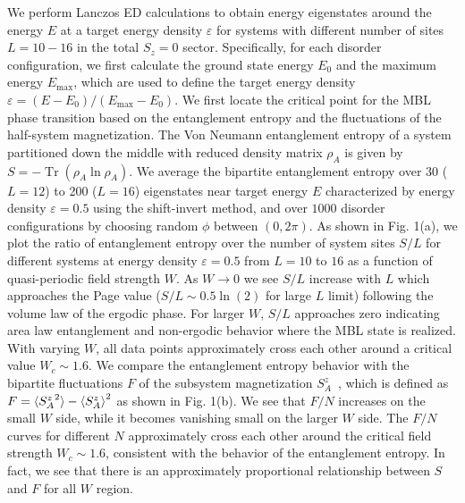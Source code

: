 \documentclass[prl,aps,epsf,showpacs,twocolumn,letterpaper]{revtex4}
\DeclareMathOperator{\tr}{Tr}
\begin{document}
We perform Lanczos ED calculations to obtain energy eigenstates around the energy $E$ at a target energy density $\varepsilon$ for systems with different number of sites $L=10-16$ in the total $S_z=0$ sector.  Specifically, for each disorder configuration, we first calculate the ground state energy $E_0$ and the maximum energy $E_\text{max}$, which are used to define the target energy density $\varepsilon = (E-E_0)/(E_\text{max} -E_0)$.
We first locate the critical point for the MBL phase transition based on the entanglement entropy and the fluctuations of the half-system magnetization\cite{luitz2015}.  The Von Neumann entanglement entropy of a system partitioned down the middle with reduced density matrix $\rho_A$ is given by $S=- \tr (\rho_A \ln \rho_A)$.  We average the bipartite entanglement entropy over 30 ($L=12$) to 200 ($L=16$) eigenstates near target energy $E$ characterized by energy density $\varepsilon=0.5$ using the shift-invert method, and over $1000$ disorder configurations by choosing random $\phi$ between $(0, 2\pi)$.  As shown in Fig. 1(a), we plot the ratio of entanglement entropy over the number of system sites $S/L$ for different systems at energy density $\varepsilon=0.5$ from $L=10$ to $16$ as a function of quasi-periodic field strength $W$.  As $W\to0$ we see $S/L$ increase with $L$ which approaches the Page value ($S/L \sim 0.5\ln(2)$ for large $L$ limit) following the volume law of the ergodic phase.  For larger $W$, $S/L$ approaches zero indicating area law entanglement and non-ergodic behavior where the MBL state is realized.  With varying $W$, all data points approximately cross each other around a critical value $W_c \sim 1.6$.  We compare the entanglement entropy behavior with the bipartite fluctuations $F$ of the subsystem magnetization $S^z_A$~\cite{luitz2015,song2012}, which is defined as $F=\braket{{S^{z}_A}^2} - \braket{S^z_A}^2$ as shown in Fig. 1(b).  We see that $F/N$ increases on the small $W$ side, while it becomes vanishing small on the larger $W$ side.  The $F/N$ curves for different $N$ approximately cross each other around the critical field strength $W_c\sim1.6$, consistent with the behavior of the entanglement entropy.  In fact, we see that there is an approximately proportional relationship between $S$ and $F$  for all $W$ region. 
\end{document}
